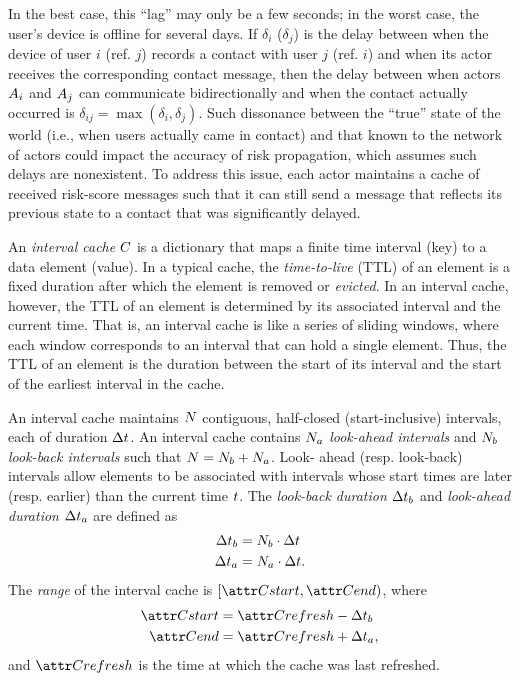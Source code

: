 In the best case, this ``lag'' may only be a few seconds; in the worst case, the user's device is offline for several days. If $\delta_i$ ($\delta_j$) is the delay between when the device of user $i$ (ref. $j$) records a contact with user $j$ (ref. $i$) and when its actor receives the corresponding contact message, then the delay between when actors $A_i$ and $A_j$ can communicate bidirectionally and when the contact actually occurred is $\delta_{ij} = \max(\delta_i, \delta_j)$. Such dissonance between the ``true'' state of the world (i.e., when users actually came in contact) and that known to the network of actors could impact the accuracy of risk propagation, which assumes such delays are nonexistent. To address this issue, each actor maintains a cache of received risk-score messages such that it can still send a message that reflects its previous state to a contact that was significantly delayed.

An \emph{interval cache} $C$ is a dictionary that maps a finite time interval (key) to a data element (value). In a typical cache, the \emph{time-to-live} (TTL) of an element is a fixed duration after which the element is removed or \emph{evicted}. In an interval cache, however, the TTL of an element is determined by its associated interval and the current time. That is, an interval cache is like a series of sliding windows, where each window corresponds to an interval that can hold a single element. Thus, the TTL of an element is the duration between the start of its interval and the start of the earliest interval in the cache.

An interval cache maintains $N$ contiguous, half-closed (start-inclusive) intervals, each of duration ${\Delta}t$. An interval cache contains $N_a$ \emph{look-ahead intervals} and $N_b$ \emph{look-back intervals} such that $N = N_b + N_a$. Look- ahead (resp. look-back) intervals allow elements to be associated with intervals whose start times are later (resp. earlier) than the current time $t$. The \emph{look-back duration} ${\Delta}t_b$ and \emph{look-ahead duration} ${\Delta}t_a$ are defined as
%
\begin{align*}
	{\Delta}t_b &= N_b \cdot {\Delta}t \\
	{\Delta}t_a &= N_a \cdot {\Delta}t .
\end{align*}
The \emph{range} of the interval cache is $[\aCacheStart, \aCacheEnd)$, where
%
\begin{align*}
	\aCacheStart &= \aCacheRefresh - \pCacheLookBack \\
	\aCacheEnd &= \aCacheRefresh + \pCacheLookAhead,
\end{align*}
%
and $\aCacheRefresh$ is the time at which the cache was last refreshed.

